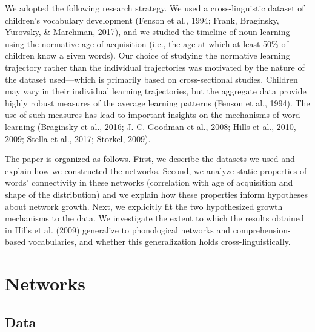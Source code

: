 \documentclass[english,floatsintext,man]{apa6}
\theoremstyle{definition}
\theoremstyle{definition}
\theoremstyle{definition}
\theoremstyle{remark}
\begin{document}
We adopted the following research strategy. We used a cross-linguistic
dataset of children's vocabulary development (Fenson et al., 1994;
Frank, Braginsky, Yurovsky, \& Marchman, 2017), and we studied the
timeline of noun learning using the normative age of acquisition (i.e.,
the age at which at least 50\% of children know a given words). Our
choice of studying the normative learning trajectory rather than the
individual trajectories was motivated by the nature of the dataset
used---which is primarily based on cross-sectional studies. Children may
vary in their individual learning trajectories, but the aggregate data
provide highly robust measures of the average learning patterns (Fenson
et al., 1994). The use of such measures has lead to important insights
on the mechanisms of word learning (Braginsky et al., 2016; J. C.
Goodman et al., 2008; Hills et al., 2010, 2009; Stella et al., 2017;
Storkel, 2009).

The paper is organized as follows. First, we describe the datasets we
used and explain how we constructed the networks. Second, we analyze
static properties of words' connectivity in these networks (correlation
with age of acquisition and shape of the distribution) and we explain
how these properties inform hypotheses about network growth. Next, we
explicitly fit the two hypothesized growth mechanisms to the data. We
investigate the extent to which the results obtained in Hills et al.
(2009) generalize to phonological networks and comprehension-based
vocabularies, and whether this generalization holds
cross-linguistically.

\section{Networks}\label{networks}

\subsection{Data}\label{data}
\end{document}

